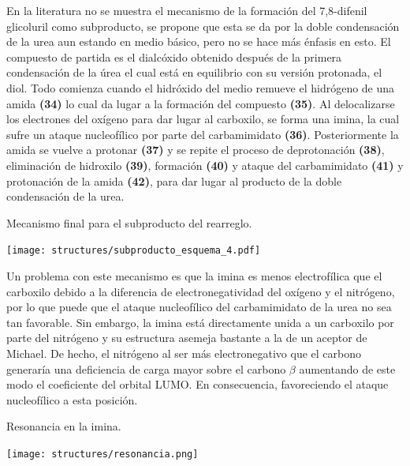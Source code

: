\documentclass[fleqn,10pt]{SelfArx}
\begin{document}
En la literatura no se muestra el mecanismo de la formación del 7,8-difenil glicoluril como subproducto, se propone que esta se da por la doble condensación de la urea aun estando en medio básico, pero no se hace más énfasis en esto. El compuesto de partida es el dialcóxido obtenido después de la primera condensación de la úrea \cite{li2010}\cite{sachdev2010} el cual está en equilibrio con su versión protonada, el diol. Todo comienza cuando el hidróxido del medio remueve el hidrógeno de una amida \textbf{(34)} lo cual da lugar a la formación del compuesto \textbf{(35)}. Al delocalizarse los electrones del oxígeno para dar lugar al carboxilo, se forma una imina, la cual sufre un ataque nucleofílico por parte del carbamimidato \textbf{(36)}. Posteriormente la amida se vuelve a protonar \textbf{(37)} y se repite el proceso de deprotonación \textbf{(38)}, eliminación de hidroxilo \textbf{(39)}, formación \textbf{(40)} y ataque del carbamimidato \textbf{(41)} y protonación de la amida \textbf{(42)}, para dar lugar al producto de la doble condensación de la urea.
\begin{scheme}[h]
	\centering
	\caption{Mecanismo final para el subproducto del rearreglo.}
	\texttt{[image: structures/subproducto\_esquema\_4.pdf]}
\end{scheme}

Un problema con este mecanismo es que la imina es menos electrofílica que el carboxilo debido a la diferencia de electronegatividad del oxígeno y el nitrógeno, por lo que puede que el ataque nucleofílico del carbamimidato de la urea no sea tan favorable. Sin embargo, la imina está directamente unida a un carboxilo por parte del nitrógeno y su estructura asemeja bastante a la de un aceptor de Michael. De hecho, el nitrógeno al ser más electronegativo que el carbono generaría una deficiencia de carga mayor sobre el carbono $\beta$ aumentando de este modo el coeficiente del orbital LUMO. En consecuencia, favoreciendo el ataque nucleofílico a esta posición.
\begin{scheme}[h]
	\centering
	\caption{Resonancia en la imina.}
	\texttt{[image: structures/resonancia.png]}
\end{scheme}
\end{document}
